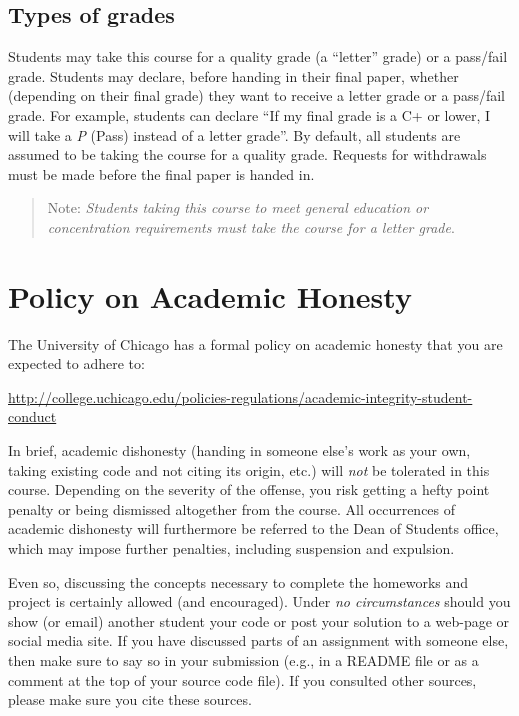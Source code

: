 \documentclass[11pt]{article}
\begin{document}
\subsection{Types of grades}

Students may take this course for a quality grade (a ``letter'' grade) or a pass/fail grade. Students may declare, before handing in their final paper, whether (depending on their final grade) they want to receive a letter grade or a pass/fail grade. For example, students can declare ``If my final grade is a C+ or lower, I will take a \emph{P} (Pass) instead of a letter grade''. By default, all students are assumed to be taking the course for a quality grade. Requests for withdrawals must be made before the final paper is handed in.

\begin{quote}
Note: \emph{Students taking this course to meet general education or concentration requirements must take the course for a letter grade}. 
\end{quote}


\section{Policy on Academic Honesty}

The University of Chicago has a formal policy on academic honesty that you are expected to adhere to:

\begin{center}
\url{http://college.uchicago.edu/policies-regulations/academic-integrity-student-conduct}
\end{center}

In brief, academic dishonesty (handing in someone else's work as your own, taking existing code and not citing its origin, etc.) will \emph{not} be tolerated in this course. Depending on the severity of the offense, you risk getting a hefty point penalty or being dismissed altogether from the course. All occurrences of academic dishonesty will furthermore be referred to the Dean of Students office, which may impose further penalties, including suspension and expulsion.

Even so, discussing the concepts necessary to complete the homeworks and project is certainly allowed (and encouraged).  Under \emph{no circumstances} should you show (or email) another student your code or post your solution to a web-page or social media site.  If you have discussed parts of an assignment with someone else, then make sure to say so in your submission (e.g., in a README file or as a comment at the top of your source code file). If you consulted other sources, please make sure you cite these sources.
\end{document}
